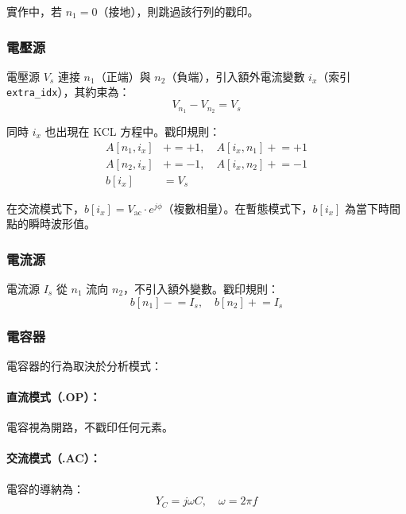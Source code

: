 \documentclass[12pt,a4paper]{article}
\begin{document}
\noindent 實作中，若 $n_1 = 0$（接地），則跳過該行列的戳印。

\subsubsection{電壓源}

電壓源 $V_s$ 連接 $n_1$（正端）與 $n_2$（負端），引入額外電流變數 $i_x$（索引 \texttt{extra\_idx}），其約束為：
\begin{equation}
V_{n_1} - V_{n_2} = V_s
\end{equation}

同時 $i_x$ 也出現在 KCL 方程中。戳印規則：
\begin{equation}
\begin{aligned}
A[n_1, i_x] &\mathrel{+}= +1, \quad A[i_x, n_1] \mathrel{+}= +1 \\
A[n_2, i_x] &\mathrel{+}= -1, \quad A[i_x, n_2] \mathrel{+}= -1 \\
b[i_x] &= V_s
\end{aligned}
\end{equation}

\noindent 在交流模式下，$b[i_x] = V_{\text{ac}} \cdot e^{j\phi}$（複數相量）。在暫態模式下，$b[i_x]$ 為當下時間點的瞬時波形值。

\subsubsection{電流源}

電流源 $I_s$ 從 $n_1$ 流向 $n_2$，不引入額外變數。戳印規則：
\begin{equation}
b[n_1] \mathrel{-}= I_s, \quad b[n_2] \mathrel{+}= I_s
\end{equation}

\subsubsection{電容器}

電容器的行為取決於分析模式：

\paragraph{直流模式（.OP）：} 電容視為開路，不戳印任何元素。

\paragraph{交流模式（.AC）：} 電容的導納為：
\begin{equation}
Y_C = j\omega C, \quad \omega = 2\pi f
\end{equation}
\end{document}
